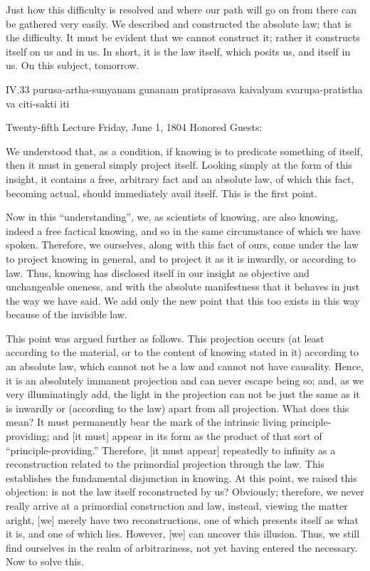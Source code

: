 Just how this difficulty is resolved
and where our path will go on from there
can be gathered very easily.
We described and constructed the absolute law;
that is the difficulty.
It must be evident that we cannot construct it;
rather it constructs itself on us and in us.
In short, it is the law itself,
which posits us, and itself in us.
On this subject, tomorrow.

IV.33
purusa-artha-sunyanam gunanam pratiprasava kaivalyam
svarupa-pratistha va citi-sakti iti

Twenty-fifth Lecture
Friday, June 1, 1804
Honored Guests:

We understood that, as a condition,
if knowing is to predicate something of itself,
then it must in general simply project itself.
Looking simply at the form of this insight,
it contains a free, arbitrary fact and an absolute law,
of which this fact, becoming actual,
should immediately avail itself.
This is the first point.

Now in this “understanding”, we, as scientists of knowing,
are also knowing, indeed a free factical knowing,
and so in the same circumstance of which we have spoken.
Therefore, we ourselves, along with this fact of ours,
come under the law to project knowing in general,
and to project it as it is inwardly, or according to law.
Thus, knowing has disclosed itself in our insight
as objective and unchangeable oneness,
and with the absolute manifestness that
it behaves in just the way we have said.
We add only the new point that this too
exists in this way because of the invisible law.

This point was argued further as follows.
This projection occurs
(at least according to the material,
or to the content of knowing stated in it)
according to an absolute law,
which cannot not be a law
and cannot not have causality.
Hence, it is an absolutely immanent projection
and can never escape being so;
and, as we very illuminatingly add,
the light in the projection can not be just
the same as it is inwardly or
(according to the law)
apart from all projection.
What does this mean?
It must permanently bear the mark of
the intrinsic living principle-providing;
and [it must] appear in its form as
the product of that sort of “principle-providing.”
Therefore, [it must appear] repeatedly to infinity
as a reconstruction related to
the primordial projection through the law.
This establishes the fundamental disjunction in knowing.
At this point, we raised this objection:
is not the law itself reconstructed by us?
Obviously; therefore, we never really arrive
at a primordial construction and law,
instead, viewing the matter aright,
[we] merely have two reconstructions,
one of which presents itself as what it is,
and one of which lies.
However, [we] can uncover this illusion.
Thus, we still find ourselves in
the realm of arbitrariness,
not yet having entered the necessary.
Now to solve this.

